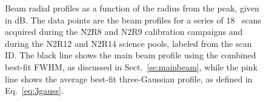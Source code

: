 \begin{figure}[!thbp]
  \caption[Stability of the beam profile]{{\lp Beam radial profiles as a
    function of the radius from the peak, given in dB. The data points
    are the beam profiles for a series of 18
    \bm\ scans acquired during the N2R8 and N2R9 calibration campaigns and
    during the N2R12 and N2R14 science pools, labeled from the scan
    ID. The black line shows the main beam profile using the combined
    best-fit FWHM, as discussed in Sect.~\ref{se:mainbeam}, while the pink
    line shows the average best-fit three-Gaussian profile, as defined
    in Eq.~\ref{eq:3gauss}.}}
  \label{fig:beam_prof}
\end{figure}



